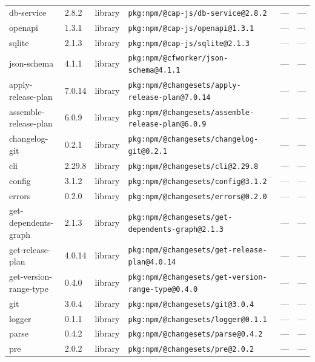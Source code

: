 \documentclass[11pt,a4paper]{article}
\begin{document}
\begin{longtable}{|p{4cm}|p{2cm}|p{1.6cm}|p{5cm}|p{1.5cm}|p{3.5cm}|}
\raggedright db-service & 2.8.2 & library & \small\texttt{pkg:npm/@cap-js/db-service@2.8.2} & — & \small — \\
\raggedright openapi & 1.3.1 & library & \small\texttt{pkg:npm/@cap-js/openapi@1.3.1} & — & \small — \\
\raggedright sqlite & 2.1.3 & library & \small\texttt{pkg:npm/@cap-js/sqlite@2.1.3} & — & \small — \\
\raggedright json-schema & 4.1.1 & library & \small\texttt{pkg:npm/@cfworker/json-schema@4.1.1} & — & \small — \\
\raggedright apply-release-plan & 7.0.14 & library & \small\texttt{pkg:npm/@changesets/apply-release-plan@7.0.14} & — & \small — \\
\raggedright assemble-release-plan & 6.0.9 & library & \small\texttt{pkg:npm/@changesets/assemble-release-plan@6.0.9} & — & \small — \\
\raggedright changelog-git & 0.2.1 & library & \small\texttt{pkg:npm/@changesets/changelog-git@0.2.1} & — & \small — \\
\raggedright cli & 2.29.8 & library & \small\texttt{pkg:npm/@changesets/cli@2.29.8} & — & \small — \\
\raggedright config & 3.1.2 & library & \small\texttt{pkg:npm/@changesets/config@3.1.2} & — & \small — \\
\raggedright errors & 0.2.0 & library & \small\texttt{pkg:npm/@changesets/errors@0.2.0} & — & \small — \\
\raggedright get-dependents-graph & 2.1.3 & library & \small\texttt{pkg:npm/@changesets/get-dependents-graph@2.1.3} & — & \small — \\
\raggedright get-release-plan & 4.0.14 & library & \small\texttt{pkg:npm/@changesets/get-release-plan@4.0.14} & — & \small — \\
\raggedright get-version-range-type & 0.4.0 & library & \small\texttt{pkg:npm/@changesets/get-version-range-type@0.4.0} & — & \small — \\
\raggedright git & 3.0.4 & library & \small\texttt{pkg:npm/@changesets/git@3.0.4} & — & \small — \\
\raggedright logger & 0.1.1 & library & \small\texttt{pkg:npm/@changesets/logger@0.1.1} & — & \small — \\
\raggedright parse & 0.4.2 & library & \small\texttt{pkg:npm/@changesets/parse@0.4.2} & — & \small — \\
\raggedright pre & 2.0.2 & library & \small\texttt{pkg:npm/@changesets/pre@2.0.2} & — & \small — \\

\end{longtable}
\end{document}
